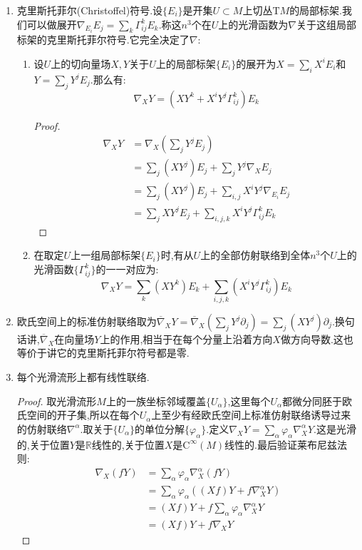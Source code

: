 \begin{enumerate}
\begin{enumerate}
\begin{proof}
	    	按照联络关于位置$X$是线性的,归结为证明如果$X(p)=0$,那么$\nabla_XY(p)=0$.可取$p$为中心的坐标卡,设$X=X^i\partial_i$,有$X^i(0)=0,\forall i$.取泰勒展开$X^i=x^kX_k^i$,那么有$\nabla_XY(p)=\nabla_{x^kX_k^i\partial_i}Y(p)=x^k(p)\nabla_{X_k^i\partial_i}Y(p)=0$.
	    \end{proof}
	\end{enumerate}
    \item 克里斯托菲尔(Christoffel)符号.设$\{E_i\}$是开集$U\subset M$上切丛$\mathrm{T}M$的局部标架.我们可以做展开$\nabla_{E_i}E_j=\sum_k\Gamma_{ij}^kE_k$.称这$n^3$个在$U$上的光滑函数为$\nabla$关于这组局部标架的克里斯托菲尔符号.它完全决定了$\nabla$:
    \begin{enumerate}
    	\item 设$U$上的切向量场$X,Y$关于$U$上的局部标架$\{E_i\}$的展开为$X=\sum_iX^iE_i$和$Y=\sum_jY^jE_j$.那么有:
    	$$\nabla_XY=\left(XY^k+X^iY^j\Gamma_{ij}^k\right)E_k$$
    	\begin{proof}
    		\begin{align*}
    			\nabla_XY&=\nabla_X(\sum_jY^jE_j)\\&=\sum_j(XY^j)E_j+\sum_jY^j\nabla_XE_j\\&=\sum_j(XY^j)E_j+\sum_{i,j}X^iY^j\nabla_{E_i}E_j\\&=\sum_jXY^jE_j+\sum_{i,j,k}X^iY^j\Gamma_{ij}^kE_k
    		\end{align*}
    	\end{proof}
        \item 在取定$U$上一组局部标架$\{E_i\}$时,有从$U$上的全部仿射联络到全体$n^3$个$U$上的光滑函数$\{\Gamma_{ij}^k\}$的一一对应为:
        $$\nabla_XY=\sum_k(XY^k)E_k+\sum_{i,j,k}\left(X^iY^j\Gamma_{ij}^k\right)E_k$$
    \end{enumerate}
    \item 欧氏空间上的标准仿射联络取为$\overline{\nabla}_XY=\overline{\nabla}_X(\sum_jY^j\partial_j)=\sum_j(XY^j)\partial_j$.换句话讲,$\overline{\nabla}_X$在向量场$Y$上的作用,相当于在每个分量上沿着方向$X$做方向导数.这也等价于讲它的克里斯托菲尔符号都是零.
    \item 每个光滑流形上都有线性联络.
    \begin{proof}
    	
    	取光滑流形$M$上的一族坐标邻域覆盖$\{U_{\alpha}\}$,这里每个$U_{\alpha}$都微分同胚于欧氏空间的开子集,所以在每个$U_{\alpha}$上至少有经欧氏空间上标准仿射联络诱导过来的仿射联络$\nabla^{\alpha}$.取关于$\{U_{\alpha}\}$的单位分解$\{\varphi_{\alpha}\}$.定义$\nabla_XY=\sum_{\alpha}\varphi_{\alpha}\nabla_X^{\alpha}Y$.这是光滑的,关于位置$Y$是$\mathbb{R}$线性的,关于位置$X$是$\mathrm{C}^{\infty}(M)$线性的.最后验证莱布尼兹法则:
    	\begin{align*}
    		\nabla_X(fY)&=\sum_{\alpha}\varphi_{\alpha}\nabla_X^{\alpha}(fY)\\&=\sum_{\alpha}\varphi_{\alpha}\left((Xf)Y+f\nabla_X^{\alpha}Y\right)\\&=(Xf)Y+f\sum_{\alpha}\varphi_{\alpha}\nabla_X^{\alpha}Y\\&=(Xf)Y+f\nabla_XY
    	\end{align*}
    \end{proof}
\end{enumerate}


